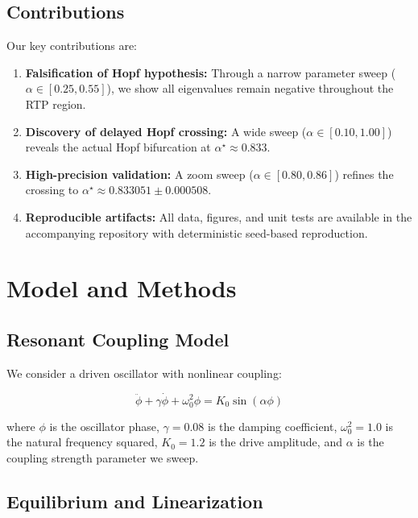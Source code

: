 \documentclass[11pt,twocolumn]{article}
\begin{document}
\subsection{Contributions}

Our key contributions are:

\begin{enumerate}
  \item \textbf{Falsification of Hopf hypothesis:} Through a narrow parameter sweep ($\alpha \in [0.25, 0.55]$),
        we show all eigenvalues remain negative throughout the RTP region.
  \item \textbf{Discovery of delayed Hopf crossing:} A wide sweep ($\alpha \in [0.10, 1.00]$) reveals the actual
        Hopf bifurcation at $\alpha^\star \approx 0.833$.
  \item \textbf{High-precision validation:} A zoom sweep ($\alpha \in [0.80, 0.86]$) refines the crossing to
        $\alpha^\star \approx 0.833051 \pm 0.000508$.
  \item \textbf{Reproducible artifacts:} All data, figures, and unit tests are available in the accompanying
        repository with deterministic seed-based reproduction.
\end{enumerate}

\section{Model and Methods}

\subsection{Resonant Coupling Model}

We consider a driven oscillator with nonlinear coupling:

\begin{equation}
  \ddot{\phi} + \gamma \dot{\phi} + \omega_0^2 \phi = K_0 \sin(\alpha \phi)
\end{equation}

where $\phi$ is the oscillator phase, $\gamma = 0.08$ is the damping coefficient, $\omega_0^2 = 1.0$ is the
natural frequency squared, $K_0 = 1.2$ is the drive amplitude, and $\alpha$ is the coupling strength parameter
we sweep.

\subsection{Equilibrium and Linearization}
\end{document}
